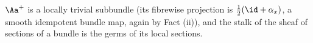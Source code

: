 $\Aa^{+}$ is a locally trivial subbundle (its fibrewise projection is $\tfrac12(\id + \alpha_x)$, a smooth idempotent bundle map, again by Fact (ii)), and the stalk of the sheaf of sections of a bundle is the germs of its local sections.
